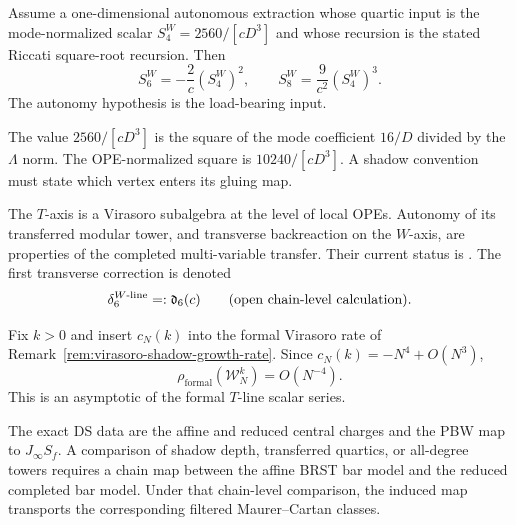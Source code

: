 \begin{proposition}
\label{prop:w3-wline-ring-relations}
Assume a one-dimensional autonomous extraction whose quartic input is
the mode-normalized scalar $S_4^W=2560/[cD^3]$ and whose recursion is
the stated Riccati square-root recursion.  Then
\[
S_6^W=-\frac{2}{c}(S_4^W)^2,
\qquad
S_8^W=\frac{9}{c^2}(S_4^W)^3.
\]
The autonomy hypothesis is the load-bearing input.
\end{proposition}

\begin{remark}
\label{rem:w3-w-line}
The value $2560/[cD^3]$ is the square of the mode coefficient
$16/D$ divided by the $\Lambda$ norm.  The OPE-normalized square is
$10240/[cD^3]$.  A shadow convention must state which vertex enters
its gluing map.
\end{remark}

\begin{remark}
\label{rem:w3-multi-channel-tower}
The $T$-axis is a Virasoro subalgebra at the level of local OPEs.
Autonomy of its transferred modular tower, and transverse
backreaction on the $W$-axis, are properties of the completed
multi-variable transfer.  Their current status is \ClaimStatusOpen.
The first transverse correction is denoted
\begin{equation}\label{eq:w3-interchannel-correction}
\delta_6^{W\text{-line}}=:\mathfrak d_6(c)
\qquad\textup{(open chain-level calculation)}.
\end{equation}
\end{remark}

\begin{proposition}
\label{prop:rho-decreasing-with-N}
Fix $k>0$ and insert $c_N(k)$ into the formal Virasoro rate of
Remark~\ref{rem:virasoro-shadow-growth-rate}.  Since
$c_N(k)=-N^4+O(N^3)$,
\[
\rho_{\mathrm{formal}}(\mathcal W_N^k)=O(N^{-4}).
\]
This is an asymptotic of the formal $T$-line scalar series.
\end{proposition}

\begin{proposition}
\label{prop:ds-shadow-cascade}
The exact DS data are the affine and reduced central charges and the
PBW map to $J_\infty S_f$.  A comparison of shadow depth, transferred
quartics, or all-degree towers requires a chain map between the
affine BRST bar model and the reduced completed bar model.  Under that
chain-level comparison, the induced map transports the corresponding
filtered Maurer--Cartan classes.
\end{proposition}

